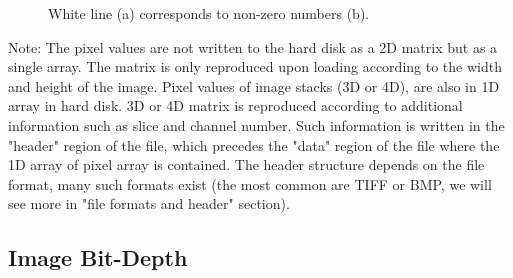 \begin{figure}[htbp]
\centering
{}
\caption{ White line (a) corresponds to non-zero numbers (b).}
\label{fig:mostbasic2}
\end{figure} 


Note: The pixel values are not written to the hard disk as a 2D matrix but as
a single array. The matrix is only reproduced upon loading according to the width
and height of the image. Pixel values of image stacks (3D or 4D), are
also in 1D array in hard disk. 3D or 4D matrix is reproduced according
to additional information such as slice and channel number. Such
information is written in the
"header" region of the file, which
precedes the "data" region of the
file where the 1D array of pixel array is contained. The header structure
 depends on the file format, many such formats exist (the most common are TIFF or BMP, we will
see more in "file formats and
header" section). 



\subsection{Image Bit-Depth}

